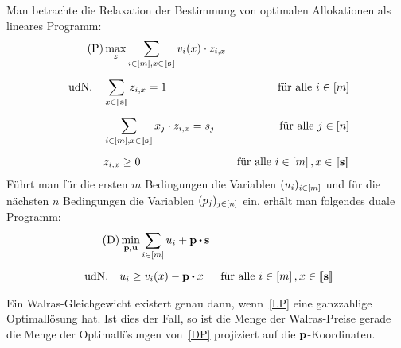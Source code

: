 Man betrachte die Relaxation der Bestimmung von optimalen Allokationen als lineares Programm:
\begin{align*}
	\tag{P}\label{LP}
	&\max_{z} \sum_{i\in\left[ m \right], x\in\left\llbracket \mathbf{s} \right\rrbracket} v_i(x) \cdot z_{i, x} \\[5pt]
	\text{udN.} \quad & \sum_{x\in\left\llbracket \mathbf{s} \right\rrbracket} z_{i, x} = 1 & \text{für alle $i\in\left[ m \right]$}\\[5pt]
	& \sum_{i\in\left[ m \right], x\in\left\llbracket \mathbf{s} \right\rrbracket} x_j \cdot z_{i,x} = s_j & \text{für alle $j\in\left[ n \right]$} \\[5pt]
	& z_{i, x} \geq 0 &\text{für alle $i\in\left[ m \right], x\in\left\llbracket \mathbf{s} \right\rrbracket$}
\end{align*}
Führt man für die ersten $m$ Bedingungen die Variablen $(u_i)_{i\in\left[ m \right]}$ und für die nächsten $n$ Bedingungen die Variablen $(p_j)_{j\in\left[ n \right]}$ ein, erhält man folgendes duale Programm:
\begin{align*}
\tag{D}\label{DP}
&\min_{\fp,\fu} \sum_{i\in\first{m}} u_i + \fp \bcdot \fs \\[5pt]
\text{udN.} \quad &  u_i \geq v_i(x) - \fp \bcdot x & \text{für alle $i\in\first{m}, x\in\ffirst{\fs}$}
\end{align*}
\begin{lemma}
	Ein Walras-Gleichgewicht existert genau dann, wenn~\eqref{LP} eine ganzzahlige Optimallösung hat.
	Ist dies der Fall, so ist die Menge der Walras-Preise gerade die Menge der Optimallösungen von~\eqref{DP} projiziert auf die $\mathbf{p}$-Koordinaten.
\end{lemma}
